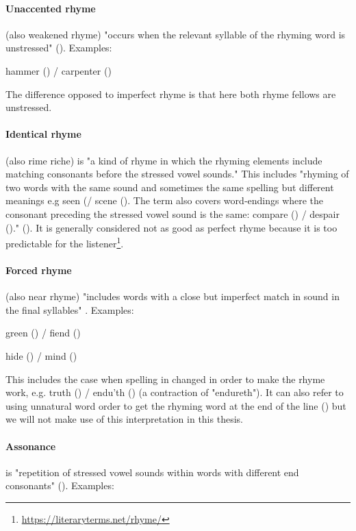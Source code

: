 \paragraph{Unaccented rhyme} (also weakened rhyme) "occurs when the relevant syllable of the rhyming word is unstressed" (\cite{britannica}). Examples: 

hammer () / carpenter ()

\noindent The difference opposed to imperfect rhyme is that here both rhyme fellows are unstressed.

\paragraph{Identical rhyme} (also rime riche) is "a kind of rhyme in which the rhyming elements include matching consonants before the stressed vowel sounds." This includes "rhyming of two words with the same sound and sometimes the same spelling but different meanings e.g seen (/ scene (). The term also covers word‐endings where the consonant preceding the stressed vowel sound is the same: compare () / despair ()." (\cite{oxforddict2008literary}). It is generally considered not as good as perfect rhyme because it is too predictable for the listener\footnote{\url{https://literaryterms.net/rhyme/}}.

\paragraph{Forced rhyme} (also near rhyme) "includes words with a close but imperfect match in sound in the final syllables" \cite{bergman2017litcharts}. Examples: 

green () / fiend ()

hide () / mind ()

\noindent This includes the case when spelling in changed in order to make the rhyme work, e.g. truth () / endu'th () (a contraction of "endureth"). It can also refer to using unnatural word order to get the rhyming word at the end of the line (\cite{bergman2017litcharts}) but we will not make use of this interpretation in this thesis.

\paragraph{Assonance} is "repetition of stressed vowel sounds within words with different end consonants" (\cite{britannica}). Examples:	

